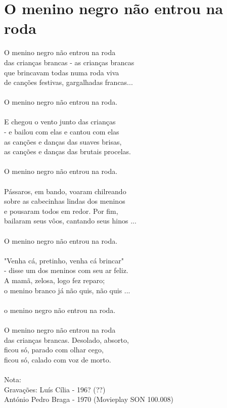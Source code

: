 \documentclass{article}
\begin{document}
\section{ O menino negro não entrou na roda}
O menino negro não entrou na roda \\
das crianças brancas - as crianças brancas \\
que brincavam todas numa roda viva \\
de canções festivas, gargalhadas francas...\\
\\
O menino negro não entrou na roda.\\
\\
E chegou o vento junto das crianças\\
- e bailou com elas e cantou com elas \\
as canções e danças das suaves brisas, \\
as canções e danças das brutais procelas.\\
\\
O menino negro não entrou na roda.\\
\\
Pássaros, em bando, voaram chilreando \\
sobre as cabecinhas lindas dos meninos \\
e pousaram todos em redor. Por fim, \\
bailaram seus vôos, cantando seus hinos ...\\
\\
O menino negro não entrou na roda.\\
\\
"Venha cá, pretinho, venha cá brincar"\\
- disse um dos meninos com seu ar feliz.\\
A mamã, zelosa, logo fez reparo;\\
o menino branco já não quis, não quis ...\\
\\
o menino negro não entrou na roda.\\
\\
O menino negro não entrou na roda\\
das crianças brancas. Desolado, absorto, \\
ficou só, parado com olhar cego, \\
ficou só, calado com voz de morto.\\
\\
Nota:\\
Gravações: Luís Cília - 196? (??)\\
	   António Pedro Braga - 1970 (Movieplay SON 100.008)\\
\end{document}
